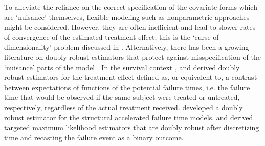 \documentclass[11pt]{article}
\begin{document}
To alleviate the reliance on the correct specification of the covariate forms which are  `nuisance' themselves, flexible modeling  such as nonparametric approaches might be considered. However, they are often inefficient and lead to slower rates of convergence of the estimated treatment effect; this is  the `curse of dimensionality' problem discussed in \cite{robins:ritov:coda}. 
 Alternatively, 
 there has been a growing literature on doubly robust estimators that protect against misspecification of the `nuisance' parts of the model \citep{RobinsRotnitzky95,robins1995analysis,scharfstein1999adjusting, robins2000marginal,robins2000marginalsnm,robins2000profile,van2003unified,RobinsRotnitzky01,bang2005doubly,tsiatis2007semiparametric,tchetgen2010doubly}. 
In the survival context \cite{zhang2012contrasting}, \cite{bai2017optimal} and \cite{sjolander2017doubly} derived doubly robust estimators for the treatment effect defined as, or equivalent to, a contrast between expectations of functions of the potential failure times, %
 i.e. the failure time that would be observed if the same subject were treated or untreated, respectively, regardless of the actual treatment received. 
 \cite{yang2020semiparametric} developed  a doubly robust estimator for the structural accelerated failure time models.
\cite{petersen2014targeted} and \cite{zheng2016doubly} derived targeted maximum likelihood estimators that are doubly robust 
after discretizing  time and recasting the failure event as a binary outcome. 


\end{document}
